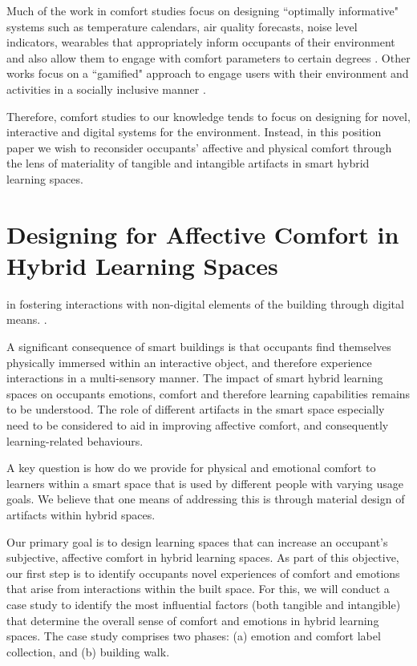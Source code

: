 \documentclass[acmconf, anonymous, review]{acmart}
\begin{document}
Much of the work in comfort studies focus on designing ``optimally informative" systems such as temperature calendars, air quality forecasts, noise level indicators, wearables that appropriately inform occupants of their environment and also allow them to engage with comfort parameters to certain degrees  \cite{costanza2016bit, milenkovic2013improving, kim2020designing}. Other works focus on a ``gamified" approach to engage users with their environment and activities in a socially inclusive manner \cite{mathur2015tiny, kwallek1997impact, zhong2022augmenting}. 

Therefore, comfort studies to our knowledge tends to focus on designing for novel, interactive and digital systems for the environment. Instead, in this position paper we wish to reconsider occupants' affective and physical comfort through the lens of materiality of tangible and intangible artifacts in smart hybrid learning spaces. 


\section{Designing for Affective Comfort in Hybrid Learning Spaces}
in fostering interactions with non-digital elements of the building through digital means. . 


A significant consequence of smart buildings is that occupants find themselves physically immersed within an interactive object, and therefore experience interactions in a multi-sensory manner. The impact of smart hybrid learning spaces on occupants emotions, comfort and therefore learning capabilities remains to be understood. The role of different artifacts in the smart space especially need to be considered to aid in improving affective comfort, and consequently learning-related behaviours.  

A key question is how do we provide for physical and emotional comfort to learners within a smart space that is used by different people with varying usage goals. We believe that one means of addressing this is through material design of artifacts within hybrid spaces.  

Our primary goal is to design learning spaces that can increase an occupant's subjective, affective comfort in hybrid learning spaces. As part of this objective, our first step is to identify occupants novel experiences of comfort and emotions that arise from interactions within the built space. For this, we will conduct a case study to identify the most influential factors (both tangible and intangible) that determine the overall sense of comfort and emotions in hybrid learning spaces. The case study comprises two phases: (a) emotion and comfort label collection, and (b) building walk. 
\end{document}
